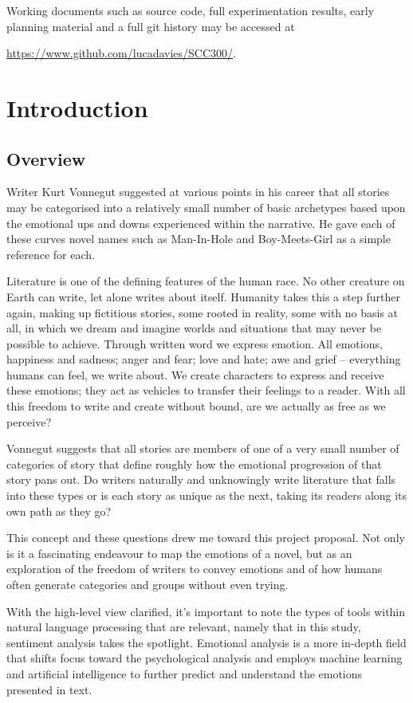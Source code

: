 \documentclass{article}
\begin{document}
    Working documents such as source code, full experimentation results, early planning material and a full git history may be accessed at {\url{https://www.github.com/lucadavies/SCC300/}.
\newpage
\tableofcontents
\newpage
\section{Introduction}
    \subsection{Overview}
        Writer Kurt Vonnegut suggested at various points in his career that all stories may be categorised into a relatively small number of basic archetypes based upon the emotional ups and downs experienced within the narrative. He gave each of these curves novel names such as Man-In-Hole and Boy-Meets-Girl as a simple reference for each. \citep{vonnegutLecture}

        Literature is one of the defining features of the human race. No other creature on Earth can write, let alone writes about itself. Humanity takes this a step further again, making up fictitious stories, some rooted in reality, some with no basis at all, in which we dream and imagine worlds and situations that may never be possible to achieve. Through written word we express emotion. All emotions, happiness and sadness; anger and fear; love and hate; awe and grief – everything humans can feel, we write about. We create characters to express and receive these emotions; they act as vehicles to transfer their feelings to a reader. With all this freedom to write and create without bound, are we actually as free as we perceive?

        Vonnegut suggests that all stories are members of one of a very small number of categories of story that define roughly how the emotional progression of that story pans out. Do writers naturally and unknowingly write literature that falls into these types or is each story as unique as the next, taking its readers along its own path as they go?

        This concept and these questions drew me toward this project proposal. Not only is it a fascinating endeavour to map the emotions of a novel, but as an exploration of the freedom of writers to convey emotions and of how humans often generate categories and groups without even trying.

        With the high-level view clarified, it's important to note the types of tools within natural language processing that are relevant, namely that in this study, sentiment analysis takes the spotlight. Emotional analysis is a more in-depth field that shifts focus toward the psychological analysis \citep{sentimentVsEmotionAnalysis} and employs machine learning and artificial intelligence to further predict and understand the emotions presented in text.
        
}
\end{document}
